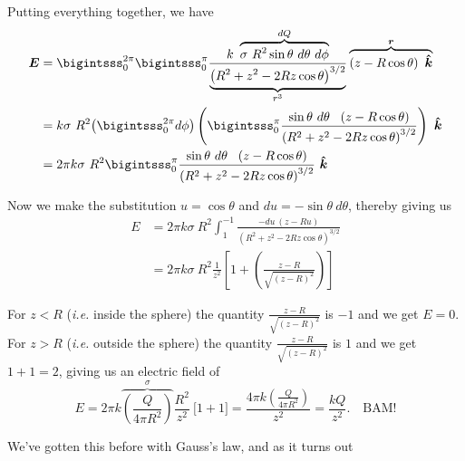 \documentclass{article}
\begin{document}
\vspace{1em}

Putting everything together, we have
\begin{align*}
    \bm{E} &= \bigintsss_{0}^{2\pi} \bigintsss_{0}^{\pi} \frac{k\ \overbrace{\sigma\ R^2 \sin{\theta}\ d\theta\ d\phi}^{dQ}}{\underbrace{\left( R^2 + z^2 - 2Rz \cos{\theta} \right)^{3/2}}_{r^3}} \overbrace{\left( z - R\cos{\theta} \right)\ \khat}^{\bm{r}} \\
           &= k \sigma\ R^2 {\left( \bigintsss_{0}^{2\pi} d\phi \right)} \left( \bigintsss_{0}^{\pi} \frac{\sin{\theta}\ d\theta\ \ \left( z - R\cos{\theta} \right)}{\left( R^2 + z^2 - 2Rz \cos{\theta} \right)^{3/2}} \right)\ \khat \\
           &= 2\pi k \sigma\ R^2 \bigintsss_{0}^{\pi} \frac{\sin{\theta}\ d\theta\ \ \left( z - R\cos{\theta} \right)}{\left( R^2 + z^2 - 2Rz \cos{\theta} \right)^{3/2}}\ \khat
\end{align*}

Now we make the substitution $u = \cos{\theta}$ and $du = -\sin{\theta}\ d\theta$, thereby giving us
\begin{align*}
    E &= 2\pi k \sigma\ R^2 \int_{1}^{-1} \frac{-du\ (z - Ru)}{\left( R^2 + z^2 - 2Rz\cos{\theta} \right)^{3/2}} \\
      &= 2\pi k \sigma\ R^2 \frac{1}{z^2} \left[ 1 + \left( \frac{z-R}{\sqrt{\left( z - R \right)^2}} \right) \right]
\end{align*}

For $z < R$ (\textit{i.e.} inside the sphere) the quantity $\frac{z-R}{\sqrt{\left(z-R\right)^2}}$ is $-1$ and we get $E = 0$. For $z > R$ (\textit{i.e.} outside the sphere) the quantity $\frac{z-R}{\sqrt{\left(z-R\right)^2}}$ is $1$ and we get $1+1 = 2$, giving us an electric field of
\begin{equation*}
    E = 2\pi k \overbrace{\left( \frac{Q}{4\pi R^2} \right)}^{\sigma} \frac{R^2}{z^2}\ \bigg[ 1 + 1 \bigg] = \frac{4\pi k \left( \frac{Q}{4\pi R^2} \right)}{z^2} = \frac{k Q}{z^2}. \quad \text{BAM!}
\end{equation*}

\vspace{1em}

We've gotten this before with Gauss's law, and as it turns out
\end{document}
